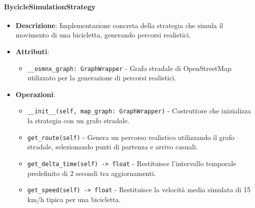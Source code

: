 \documentclass[10pt]{article}
\begin{document}
    \paragraph{BycicleSimulationStrategy}
    \begin{itemize}
        \item \textbf{Descrizione}: Implementazione concreta della strategia che simula il movimento di una bicicletta, generando percorsi realistici.
        \item \textbf{Attributi}:
        \begin{itemize}
            \item \texttt{\_\_osmnx\_graph: GraphWrapper} - Grafo stradale di OpenStreetMap utilizzato per la generazione di percorsi realistici.
        \end{itemize}
        \item \textbf{Operazioni}:
        \begin{itemize}
            \item \texttt{\_\_init\_\_(self, map\_graph: GraphWrapper)} - Costruttore che inizializza la strategia con un grafo stradale.
            \item \texttt{get\_route(self)} - Genera un percorso realistico utilizzando il grafo stradale, selezionando punti di partenza e arrivo casuali.
            \item \texttt{get\_delta\_time(self) -> float} - Restituisce l'intervallo temporale predefinito di 2 secondi tra aggiornamenti.
            \item \texttt{get\_speed(self) -> float} - Restituisce la velocità media simulata di 15 km/h tipica per una bicicletta.
        \end{itemize}
    \end{itemize}
\end{document}
